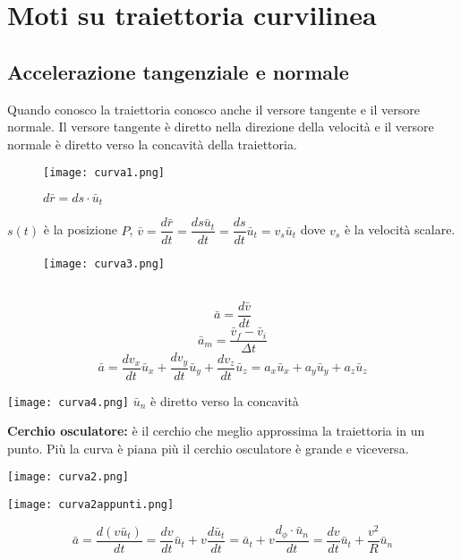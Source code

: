 \documentclass[../../main.tex]{subfiles}
\begin{document}
\section{Moti su traiettoria curvilinea}
\subsection{Accelerazione tangenziale e normale}
Quando conosco la traiettoria conosco anche il versore tangente e il versore normale. Il versore tangente è diretto nella direzione della velocità e il versore normale è diretto verso la concavità della traiettoria.
\begin{figure}[h!]
    \centering
    \texttt{[image: curva1.png]}
    \caption{$d\bar r = ds\cdot \bar u_t$}
\end{figure}
$s(t)$ è la posizione $P$, $\bar{v} = \dfrac{d\bar r}{dt} = \dfrac{ds \bar u_t}{dt} = \dfrac{ds}{dt}\bar u_t = v_s\bar u_t$ dove $v_s$ è la velocità scalare.
\begin{figure}[h!]
    \centering
    \texttt{[image: curva3.png]}
\end{figure}\
\[
    \bar a = \dfrac{d\bar v}{dt}
\]
\[
    \bar a_m = \dfrac{\bar v_f - \bar v_i}{\Delta t}
\]
\[
    \bar{a} = \dfrac{dv_x}{dt}\bar{u}_x + \dfrac{dv_y}{dt}\bar{u}_y + \dfrac{dv_z}{dt}\bar{u}_z = a_x\bar{u}_x + a_y\bar{u}_y + a_z\bar{u}_z
\]
\begin{minipage}{0.5\textwidth}
    \centering
    \texttt{[image: curva4.png]}
    $\bar u_n$ è diretto verso la concavità
\end{minipage}
\begin{minipage}{0.5\textwidth}
    \textbf{Cerchio osculatore:} è il cerchio che meglio approssima la traiettoria in un punto. Più la curva è piana più il cerchio osculatore è grande e viceversa.
\end{minipage}
\begin{minipage}{0.5\textwidth}
    \centering
    \texttt{[image: curva2.png]}
\end{minipage}
\begin{minipage}{0.5\textwidth}
    \centering
    \texttt{[image: curva2appunti.png]}
\end{minipage}

\[
    \bar a = \dfrac{d(v \bar u_t)}{dt} = \dfrac{dv}{dt}\bar u_t + v\dfrac{d\bar u_t}{dt} = \bar a_t + v\dfrac{d_\phi \cdot \bar u_n}{dt} = \dfrac{dv}{dt}\bar{u}_t + \dfrac{v^2}{R}\bar{u}_n
\]
\end{document}
